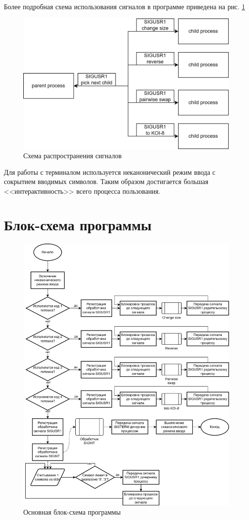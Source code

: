Более подробная схема использования сигналов в программе приведена на рис. \ref{fig:signals}

\begin{figure}[h]
    \centering
    \includegraphics[width=0.75\linewidth]{images/lab1_signals.drawio.png}
    \caption{Схема распространения сигналов}
    \label{fig:signals}
\end{figure}

Для работы с терминалом используется неканонический режим ввода с сокрытием
вводимых символов. Таким образом достигается большая <<интерактивность>> всего
процесса пользования.

\newpage

\section*{Блок-схема программы}

\begin{figure}[h]
    \centering
    \includegraphics[width=0.75\linewidth]{images/lab1_block_scheme.drawio.png}
    \caption{Основная блок-схема программы}
    \label{fig:flowchart}
\end{figure}

